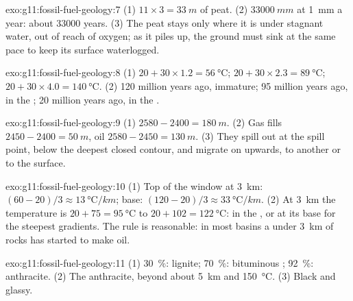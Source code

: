 \begin{solution}{exo:g11:fossil-fuel-geology:7}
(1) $11 \times 3 = \qty{33}{m}$ of peat. (2) $\qty{33000}{mm}$ at
\qty{1}{mm} a year: about \num{33000} years. (3) The peat stays only where
it is under stagnant water, out of reach of oxygen; as it piles up, the
ground must sink at the same pace to keep its surface waterlogged.
\end{solution}

\begin{solution}{exo:g11:fossil-fuel-geology:8}
(1) $20 + 30 \times 1.2 = \qty{56}{\degreeCelsius}$;
$20 + 30 \times 2.3 = \qty{89}{\degreeCelsius}$;
$20 + 30 \times 4.0 = \qty{140}{\degreeCelsius}$.
(2) 120 million years ago, immature; 95 million years ago, in the ; 20 million years ago, in the .
\end{solution}

\begin{solution}{exo:g11:fossil-fuel-geology:9}
(1) $2580 - 2400 = \qty{180}{m}$. (2) Gas fills
$2450 - 2400 = \qty{50}{m}$, oil $2580 - 2450 = \qty{130}{m}$. (3) They spill
out at the spill point, below the deepest closed contour, and migrate on
upwards, to another  or to the surface.
\end{solution}

\begin{solution}{exo:g11:fossil-fuel-geology:10}
(1) Top of the window at \qty{3}{km}: $(60 - 20)/3 \approx
\qty{13}{\degreeCelsius/km}$; base: $(120 - 20)/3 \approx
\qty{33}{\degreeCelsius/km}$. (2) At \qty{3}{km} the temperature is
$20 + 75 = \qty{95}{\degreeCelsius}$ to $20 + 102 = \qty{122}{\degreeCelsius}$:
in the , or at its base for the steepest gradients. The rule is
reasonable: in most basins a  under \qty{3}{km} of rocks has
started to make oil.
\end{solution}

\begin{solution}{exo:g11:fossil-fuel-geology:11}
(1) \qty{30}{\percent}: lignite; \qty{70}{\percent}: bituminous ;
\qty{92}{\percent}: anthracite. (2) The anthracite, beyond about
\qty{5}{km} and \qty{150}{\degreeCelsius}. (3) Black and glassy.
\end{solution}

